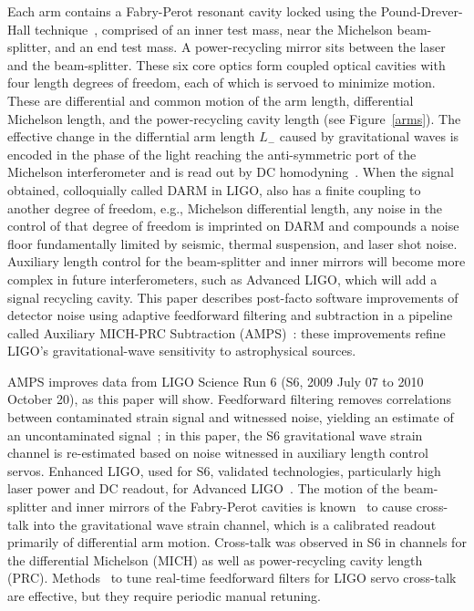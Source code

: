 Each arm contains a Fabry-Perot resonant cavity locked using the Pound-Drever-Hall technique~\cite{Black2001}, comprised of an inner test mass, near the Michelson beam-splitter, and an end test mass. A power-recycling mirror sits between the laser and the beam-splitter. These six core optics form coupled optical cavities with four length degrees of freedom, each of which is servoed to minimize motion. These are differential and common motion of the arm length, differential Michelson length, and the power-recycling cavity length (see Figure~\ref{arms}). The effective change in the differntial arm length $L_-$ caused by gravitational waves is encoded in the phase of the light reaching the anti-symmetric port of the Michelson interferometer and is read out by DC homodyning~\cite{Fricke2009}. When the signal obtained, colloquially called DARM in LIGO, also has a finite coupling to another degree of freedom, e.g., Michelson differential length, any noise in the control of that degree of freedom is imprinted on DARM and compounds a noise floor fundamentally limited by seismic, thermal suspension, and laser shot noise. Auxiliary length control for the beam-splitter and inner mirrors will become more complex in future interferometers, such as Advanced LIGO, which will add a signal recycling cavity. This paper describes post-facto software improvements of detector noise using adaptive feedforward filtering and subtraction in a pipeline called Auxiliary MICH-PRC Subtraction (AMPS)~\cite{MatappsRepository}: these improvements refine LIGO's gravitational-wave sensitivity to astrophysical sources.

AMPS improves data from LIGO Science Run 6 (S6, 2009 July 07 to 2010 October 20), as this paper will show. Feedforward filtering removes correlations between contaminated strain signal and witnessed noise, yielding an estimate of an uncontaminated signal~\cite{AllenHuaOttewill1999}; in this paper, the S6 gravitational wave strain channel is re-estimated based on noise witnessed in auxiliary length control servos. Enhanced LIGO, used for S6, validated technologies, particularly high laser power and DC readout, for Advanced LIGO~\cite{Fricke2009}. The motion of the beam-splitter and inner mirrors of the Fabry-Perot cavities is known~\cite{AdhikariThesis,BallmerThesis} to cause cross-talk into the gravitational wave strain channel, which is a calibrated readout primarily of differential arm motion. Cross-talk was observed in S6 in channels for the differential Michelson (MICH) as well as power-recycling cavity length (PRC). Methods~\cite{KisselThesis} to tune real-time feedforward filters for LIGO servo cross-talk are effective, but they require periodic manual retuning. 

